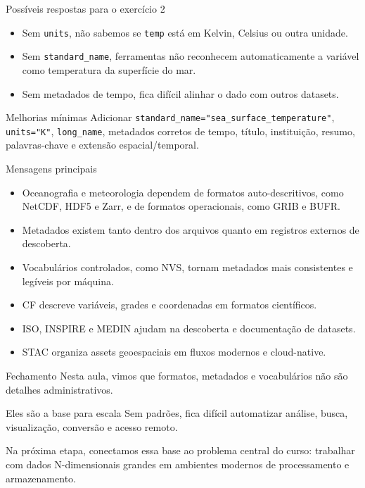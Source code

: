 \documentclass[aspectratio=169]{beamer}
\begin{document}
\begin{frame}{Possíveis respostas para o exercício 2}
\begin{itemize}
  \item Sem \texttt{units}, não sabemos se \texttt{temp} está em Kelvin, Celsius ou outra unidade.
  \item Sem \texttt{standard\_name}, ferramentas não reconhecem automaticamente a variável como temperatura da superfície do mar.
  \item Sem metadados de tempo, fica difícil alinhar o dado com outros datasets.
\end{itemize}

\vspace{0.4cm}

\begin{block}{Melhorias mínimas}
Adicionar \texttt{standard\_name="sea\_surface\_temperature"}, \texttt{units="K"}, \texttt{long\_name}, metadados corretos de tempo, título, instituição, resumo, palavras-chave e extensão espacial/temporal.
\end{block}
\end{frame}

\begin{frame}{Mensagens principais}
\begin{itemize}
  \item Oceanografia e meteorologia dependem de formatos auto-descritivos, como NetCDF, HDF5 e Zarr, e de formatos operacionais, como GRIB e BUFR.
  \item Metadados existem tanto dentro dos arquivos quanto em registros externos de descoberta.
  \item Vocabulários controlados, como NVS, tornam metadados mais consistentes e legíveis por máquina.
  \item CF descreve variáveis, grades e coordenadas em formatos científicos.
  \item ISO, INSPIRE e MEDIN ajudam na descoberta e documentação de datasets.
  \item STAC organiza assets geoespaciais em fluxos modernos e cloud-native.
\end{itemize}
\end{frame}

\begin{frame}{Fechamento}
\Large
Nesta aula, vimos que formatos, metadados e vocabulários não são detalhes administrativos.

\vspace{0.5cm}

\begin{block}{Eles são a base para escala}
Sem padrões, fica difícil automatizar análise, busca, visualização, conversão e acesso remoto.
\end{block}

\vspace{0.4cm}

Na próxima etapa, conectamos essa base ao problema central do curso: trabalhar com dados N-dimensionais grandes em ambientes modernos de processamento e armazenamento.
\end{frame}
\end{document}
